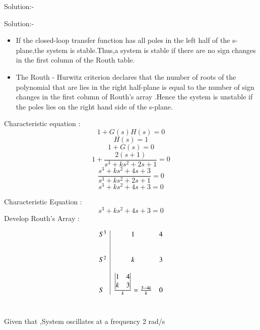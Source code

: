 \documentclass[journal,12pt,twocolumn]{IEEEtran}
\begin{document}
\begin{frame}{Solution:- }
\begin{frame}{Solution:- }

\end{frame}
\begin{frame}{}
\begin{itemize}
\\
Routh's Stability Condition
\\
   \item If the closed-loop transfer function has all poles in the left half of the s-plane,the system is stable.Thus,a system is stable if there are no sign changes in the first column of the Routh table.
   \item The Routh - Hurwitz criterion declares that the number of roots of the polynomial that are lies in the right half-plane is equal to the number of sign changes in the first column of Routh's array .Hence the system is unstable if the poles lies on the right hand side of the s-plane.
   
\end{itemize}

\end{frame}

\begin{frame}{}
Characteristic equation : $$1 + G(s)H(s) = 0$$
$$H(s) = 1 $$
$$ 1 + G(s) = 0$$
$$ 1 + \frac{2(s+1)}{s^3 + ks^2 + 2s +1} = 0$$
$$ \frac{s^3+ks^2+4s+3}{s^3 + ks^2 + 2s +1} = 0 $$
$$ s^3+ks^2+4s+3 = 0$$
\end{frame}

\begin{frame}{}
Characteristic Equation :\\
$$s^3+ks^2+4s+3 = 0$$
Develop Routh's Array :\\
\begin{centre}
\[ \begin{array}{l|c  r}
\mbox S^3 & 1 & 4 \\~\\~\\
\mbox S^2 & k & 3 \\~\\
\mbox S & \frac{\begin{vmatrix}
1 & 4 \\ 
k & 3 \\  
\end{vmatrix}}{k} = \frac{3 - 4k}{k} & 0 \end{array}\] 
\\
\end{centre}
\end{frame}
\begin{frame}{}
 Given that ,System oscillates at a frequency 2 rad/s \\
\begin{itemize}


\end{itemize}
\end{frame}
\end{frame}
\end{document}

